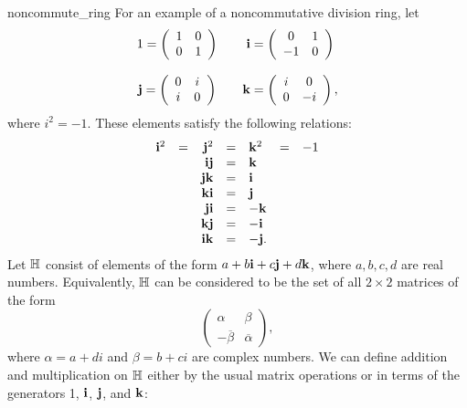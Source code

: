  
\begin{example}{noncommute_ring}
For an example of a noncommutative division ring, let
\[
\begin{array}{ccc}
1 = 
\left(
\begin{array}{cc}
1 & 0 \\
0 & 1
\end{array}
\right)
& &
{\bold i}
=
\left(
\begin{array}{cc}
0 & 1 \\
-1 & 0
\end{array}
\right)
\\ & & \\
{\bold j} =
\left(
\begin{array}{cc}
0 & i \\
i & 0
\end{array}
\right)
& &
{\bold k} = 
\left(
\begin{array}{cc}
i & 0 \\
0 & -i
\end{array}
\right),
\end{array}
\]
where $i^2 = -1$. These elements satisfy the following relations: 
\[
\begin{array}{ccrclcc}
{\bold i}^2 & = & {\bold j}^2 & = &  {\bold k}^2 & = & -1 \\
& & {\bold i}  {\bold j} & = &  {\bold k} && \\
& & {\bold j}  {\bold k} & = &  {\bold i} && \\
& & {\bold k}  {\bold i} & = &  {\bold j} && \\
& & {\bold j}  {\bold i} & = &  - {\bold k} && \\
& & {\bold k}  {\bold j} & = &  - {\bold i} && \\
& & {\bold i}  {\bold k} & = &  - {\bold j}. &&
\end{array}
\]
Let ${\Bbb H}$\label{noteringH} consist of elements of the form $a + b
{\bold i}  + c {\bold j} +d {\bold k}$, where $a, b , c, d$ are real
numbers. Equivalently, ${\Bbb H}$ can be considered to be the set of
all $2 \times 2$ matrices of the form  
\[
\left(
\begin{array}{cc}
\alpha & \beta \\
-\overline{\beta} & \overline{\alpha }
\end{array}
\right),
\]
where $\alpha = a + di$ and $\beta = b+ci$ are complex numbers. We can
define addition and multiplication on ${\Bbb H}$ either by the usual matrix
operations or in terms of the generators 1, ${\bold i}$, ${\bold j}$,
and ${\bold k}$: 

\end{example}
